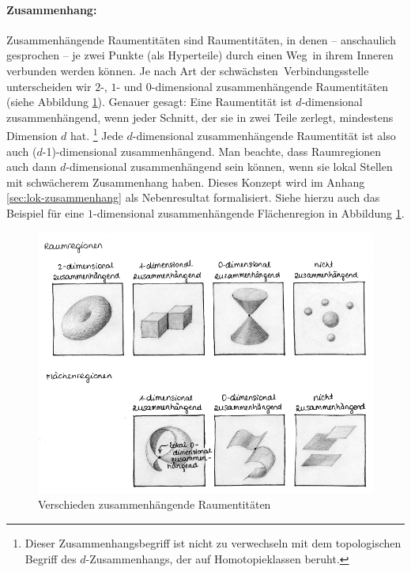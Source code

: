     \paragraph{Zusammenhang:}
        Zusammenhängende
        Raumentitäten sind Raumentitäten, in denen -- anschaulich gesprochen -- je zwei Punkte (als Hyperteile) durch einen \glqq Weg\grqq\ in ihrem Inneren verbunden werden können.
        Je nach Art der \glqq schwächsten\grqq\ Verbindungsstelle unterscheiden wir $2$-, $1$- und $0$-dimensional zusammenhängende Raumentitäten (siehe Abbildung \ref{fig:zusammenhang}).
        Genauer gesagt: Eine Raumentität ist $d$-dimensional zusammenhängend, wenn jeder Schnitt, der sie in zwei Teile zerlegt, mindestens Dimension $d$ hat.%
        \footnote{
            Dieser Zusammenhangsbegriff ist nicht zu verwechseln mit dem topologischen Begriff des $d$-Zusammenhangs, der auf Homotopieklassen beruht.
        }
        Jede $d$-dimensional zusammenhängende Raumentität ist also auch ($d$-1)-dimensional zusammenhängend.
        Man beachte, dass Raumregionen auch dann $d$-dimensional zusammenhängend sein können, wenn sie lokal Stellen mit schwächerem Zusammenhang haben. Dieses Konzept wird im Anhang \ref{sec:lok-zusammenhang} als Nebenresultat formalisiert. Siehe hierzu auch das Beispiel für eine $1$-dimensional zusammenhängende Flächenregion in Abbildung \ref{fig:zusammenhang}.

        \begin{figure}[ht]
            \centering
            \includegraphics[width=\textwidth]{bearbeitet-22-04-25/zusammenhang_2.png}
            \caption{Verschieden zusammenhängende Raumentitäten}
            \label{fig:zusammenhang}
        \end{figure}
    
